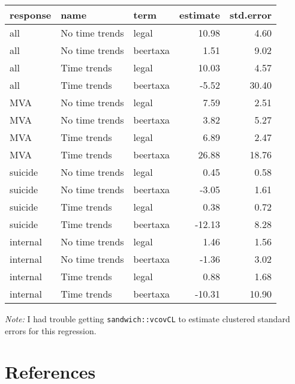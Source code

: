 \documentclass[]{book}
\newenvironment{Shaded}{\begin{snugshade}}{\end{snugshade}}
\newcommand{\KeywordTok}[1]{\textcolor[rgb]{0.13,0.29,0.53}{\textbf{#1}}}
\newcommand{\DataTypeTok}[1]{\textcolor[rgb]{0.13,0.29,0.53}{#1}}
\newcommand{\DecValTok}[1]{\textcolor[rgb]{0.00,0.00,0.81}{#1}}
\newcommand{\StringTok}[1]{\textcolor[rgb]{0.31,0.60,0.02}{#1}}
\newcommand{\OperatorTok}[1]{\textcolor[rgb]{0.81,0.36,0.00}{\textbf{#1}}}
\newcommand{\NormalTok}[1]{#1}
\theoremstyle{definition}
\theoremstyle{definition}
\theoremstyle{definition}
\theoremstyle{remark}
\begin{document}
\begin{Shaded}
\end{Shaded}

\begin{tabular}{l|l|l|r|r}
\hline
response & name & term & estimate & std.error\\
\hline
all & No time trends & legal & 10.98 & 4.60\\
\hline
all & No time trends & beertaxa & 1.51 & 9.02\\
\hline
all & Time trends & legal & 10.03 & 4.57\\
\hline
all & Time trends & beertaxa & -5.52 & 30.40\\
\hline
MVA & No time trends & legal & 7.59 & 2.51\\
\hline
MVA & No time trends & beertaxa & 3.82 & 5.27\\
\hline
MVA & Time trends & legal & 6.89 & 2.47\\
\hline
MVA & Time trends & beertaxa & 26.88 & 18.76\\
\hline
suicide & No time trends & legal & 0.45 & 0.58\\
\hline
suicide & No time trends & beertaxa & -3.05 & 1.61\\
\hline
suicide & Time trends & legal & 0.38 & 0.72\\
\hline
suicide & Time trends & beertaxa & -12.13 & 8.28\\
\hline
internal & No time trends & legal & 1.46 & 1.56\\
\hline
internal & No time trends & beertaxa & -1.36 & 3.02\\
\hline
internal & Time trends & legal & 0.88 & 1.68\\
\hline
internal & Time trends & beertaxa & -10.31 & 10.90\\
\hline
\end{tabular}

\emph{Note:} I had trouble getting \texttt{sandwich::vcovCL} to estimate
clustered standard errors for this regression.

\section{References}\label{references-5}
\end{document}
